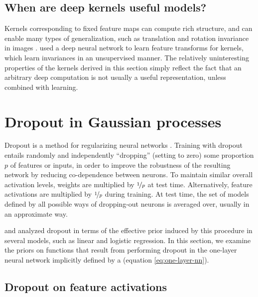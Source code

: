 \documentclass[twoside]{article}
\makeatletter
\newlength{\nonHumbleHeight}
\def\@humbleformat#1{{\settoheight{\nonHumbleHeight}{#1}\resizebox{!}{0.94\nonHumbleHeight}{#1}}}%
\newcommand\humble[1]{{\@humbleformat{#1}}}%
\newcommand{\gp}{{\humble{GP}}}
\newcommand{\sectiondist}{}
\makeatother
\begin{document}
\subsection{When are deep kernels useful models?}
\sectiondist
Kernels corresponding to fixed feature maps can compute %
rich structure, and can enable many types of generalization, such as translation and rotation invariance in images \citep{kondor2008group}.
\cite{SalHin08} used a deep neural network to learn feature transforms for kernels, which learn invariances in an unsupervised manner.
The relatively uninteresting properties of the kernels derived in this section simply reflect the fact that an arbitrary deep computation is not usually a useful representation, unless combined with learning.



\section{Dropout in Gaussian processes}
\sectiondist


Dropout is a method for regularizing neural networks \citep{hinton2012improving, srivastava2013improving}.
Training with dropout entails randomly and independently ``dropping'' (setting to zero) some proportion $p$ of features or inputs, in order to improve the robustness of the resulting network by reducing co-dependence between neurons.
To maintain similar overall activation levels, weights are multiplied by $\nicefrac{1}{p}$ at test time. Alternatively, feature activations are multiplied by $\nicefrac{1}{p}$ during training.
At test time, the set of models defined by all possible ways of dropping-out neurons is averaged over, usually in an approximate way.

\citet{baldi2013understanding} and \citet{wang2013fast} analyzed dropout in terms of the effective prior induced by this procedure in several models, such as linear and logistic regression.
In this section, we examine the priors on functions that result from performing dropout in the one-layer neural network implicitly defined by a \gp{} (equation \eqref{eq:one-layer-nn}).


\subsection{Dropout on feature activations}
\end{document}
